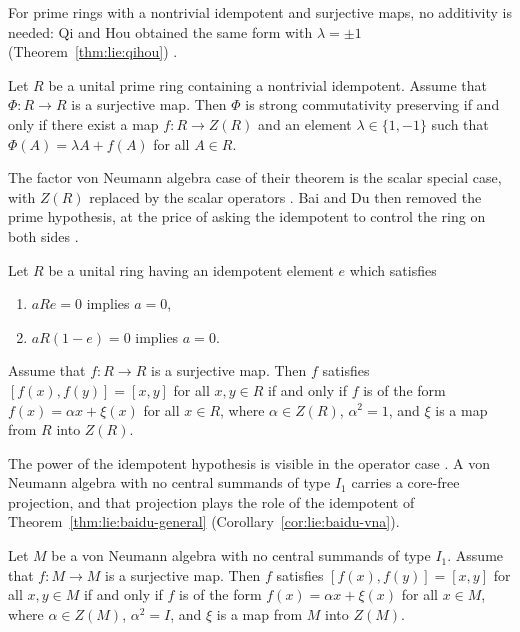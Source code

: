 For prime rings with a nontrivial idempotent and surjective maps, no
additivity is needed: Qi and Hou obtained the same form with
$\lambda=\pm1$ (Theorem~\ref{thm:lie:qihou}) \cite[p.~2791]{QiHou2010}.

\begin{theorem}\label{thm:lie:qihou}
Let $R$ be a unital prime ring containing a nontrivial idempotent. Assume
that $\varPhi\colon R\to R$ is a surjective map. Then $\varPhi$ is strong
commutativity preserving if and only if there exist a map $f\colon R\to Z(R)$
and an element $\lambda\in\{1,-1\}$ such that $\varPhi(A)=\lambda A+f(A)$
for all $A\in R$.
\end{theorem}

The factor von Neumann algebra case of their theorem is the scalar special
case, with $Z(R)$ replaced by the scalar operators \cite[p.~2795]{QiHou2010}.
Bai and Du then removed the prime hypothesis, at the price of asking the
idempotent to control the ring on both sides \cite[p.~733]{BaiDu2014}.

\begin{theorem}\label{thm:lie:baidu-general}
Let $R$ be a unital ring having an idempotent element $e$ which satisfies
\begin{enumerate}
\item[(i)] $aRe=0$ implies $a=0$,
\item[(ii)] $aR(1-e)=0$ implies $a=0$.
\end{enumerate}
Assume that $f\colon R\to R$ is a surjective map. Then $f$ satisfies
$[f(x),f(y)]=[x,y]$ for all $x,y\in R$ if and only if $f$ is of the form
$f(x)=\alpha x+\xi(x)$ for all $x\in R$, where $\alpha\in Z(R)$,
$\alpha^{2}=1$, and $\xi$ is a map from $R$ into $Z(R)$.
\end{theorem}

The power of the idempotent hypothesis is visible in the operator case
\cite[p.~741]{BaiDu2014}. A von Neumann algebra with no central summands of type $I_{1}$ carries a
core-free projection, and that projection plays the role of the idempotent
of Theorem~\ref{thm:lie:baidu-general} \cite[p.~741]{BaiDu2014} (Corollary~\ref{cor:lie:baidu-vna}).

\begin{corollary}\label{cor:lie:baidu-vna}
Let $M$ be a von Neumann algebra with no central summands of type $I_{1}$.
Assume that $f\colon M\to M$ is a surjective map. Then $f$ satisfies
$[f(x),f(y)]=[x,y]$ for all $x,y\in M$ if and only if $f$ is of the form
$f(x)=\alpha x+\xi(x)$ for all $x\in M$, where $\alpha\in Z(M)$,
$\alpha^{2}=I$, and $\xi$ is a map from $M$ into $Z(M)$.
\end{corollary}

